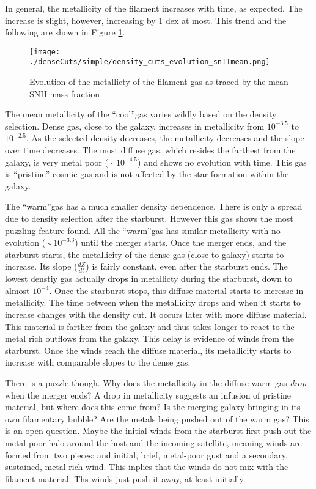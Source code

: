 \documentclass{article}
\newcommand{\cool}{``cool''}
\newcommand{\warm}{``warm''}
\begin{document}
In general, the metallicity of the filament increases with time, as expected. The
increase is slight, however, increasing by 1 dex at most. This trend and the
following are shown in Figure \ref{snIImean}.

\begin{figure}[h!]
\centering
\texttt{[image: ./denseCuts/simple/density\_cuts\_evolution\_snIImean.png]}
\caption{Evolution of the metallicty of the filament gas as traced by the mean
SNII mass fraction}
\label{snIImean}
\end{figure}

The mean metallicity of the \cool gas varies wildly based on the density
selection. Dense gas, close to the galaxy, increases in metallicity from
$10^{-3.5}$ to $10^{-2.5}$. As the selected density decreases, the metallicity
decreases and the slope over time decreases. The most diffuse gas, which resides
the farthest from the galaxy, is very metal poor ($\sim\,10^{-4.5}$) and shows no
evolution with time. This gas is ``pristine'' cosmic gas and is not affected by
the star formation within the galaxy. 

The \warm gas has a much smaller density dependence. There is only a spread due
to density selection after the starburst. However this gas shows the most
puzzling feature found. All the \warm gas has similar metallicity with no
evolution ($\sim\,10^{-3.3}$) until the merger starts. Once the merger ends, and
the starburst starts, the metallicity of the dense gas (close to galaxy) starts
to increase. Its slope ($\frac{dZ}{dt}$) is fairly constant, even after the
starburst ends. The lowest denstiy gas actually drops in metallicty during the
starburst, down to almost $10^{-4}$. Once the starburst stops, this diffuse
material starts to increase in metallicity. The time between when the metallicity
drops and when it starts to increase changes with the density cut. It occurs
later with more diffuse material. This material is farther from the galaxy and
thus takes longer to react to the metal rich outflows from the galaxy. This delay
is evidence of winds from the starburst. Once the winds reach the diffuse
material, its metallicity starts to increase with comparable slopes to the dense
gas. 

There is a puzzle though. Why does the metallicity in the diffuse warm gas 
{\it drop} when the merger ends? A drop in metallicity suggests an infusion of
pristine material, but where does this come from? Is the merging galaxy bringing
in its own filamentary bubble? Are the metals being pushed out of the warm gas?
This is an open question. Maybe the initial winds from the starburst first push
out the metal poor halo around the host and the incoming satellite, meaning winds
are formed from two pieces: and initial, brief, metal-poor gust and a secondary, 
sustained, metal-rich wind. This inplies that the winds do not mix with the
filament material. Ths winds just push it away, at least initially. 
\end{document}
